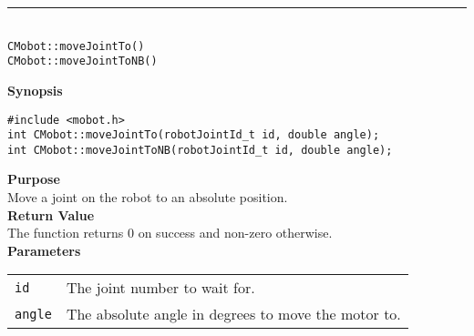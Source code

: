 \noindent
\vspace{5pt}
\rule{4.5in}{0.015in}\\
\noindent
{\LARGE \texttt{CMobot::moveJointTo()}}\\
{\LARGE \texttt{CMobot::moveJointToNB()}}\\
{}

\noindent
{\bf Synopsis}
\vspace{-8pt}
\begin{verbatim}
#include <mobot.h>
int CMobot::moveJointTo(robotJointId_t id, double angle);
int CMobot::moveJointToNB(robotJointId_t id, double angle);
\end{verbatim}

\noindent
{\bf Purpose}\\
Move a joint on the robot to an absolute position.\\

\noindent
{\bf Return Value}\\
The function returns 0 on success and non-zero otherwise.\\

\noindent
{\bf Parameters}\\
\vspace{-0.1in}
\begin{description}
\item               
\begin{tabular}{p{10 mm}p{145 mm}}
\texttt{id} & The joint number to wait for. \\
\texttt{angle} & The absolute angle in degrees to move the motor to.  \\
\end{tabular}
\end{description}

